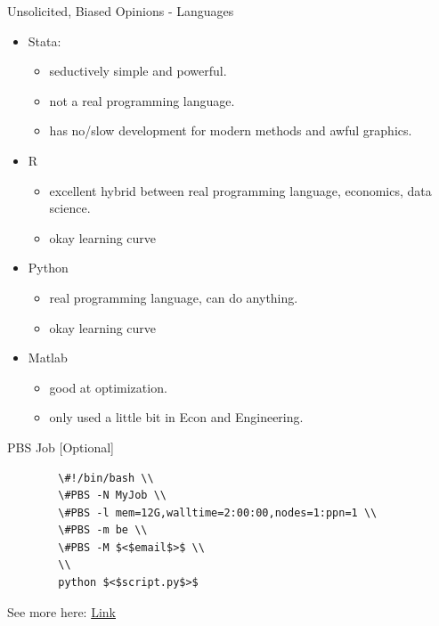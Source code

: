 \documentclass{beamer}
\begin{document}
\begin{frame}{Unsolicited, Biased Opinions - Languages}
    \begin{itemize}
        \item Stata: 
        \begin{itemize}
            \item seductively simple and powerful.
            \item not a real programming language.
            \item has no/slow development for modern methods and awful graphics.
        \end{itemize}
        \item R
        \begin{itemize}
            \item excellent hybrid between real programming language, economics, data science.
            \item okay learning curve
        \end{itemize}
        \item Python
        \begin{itemize}
            \item real programming language, can do anything.
            \item okay learning curve
        \end{itemize}
        \item Matlab
        \begin{itemize}
            \item good at optimization.
            \item only used a little bit in Econ and Engineering.
        \end{itemize}
    \end{itemize}
\end{frame}


\begin{frame}[label=BashFileSlide]{PBS Job [Optional]}
    \begin{verbatim}
        \#!/bin/bash \\
        \#PBS -N MyJob \\
        \#PBS -l mem=12G,walltime=2:00:00,nodes=1:ppn=1 \\
        \#PBS -m be \\
        \#PBS -M $<$email$>$ \\
        \\
        python $<$script.py$>$
    \end{verbatim}
    See more here: \href{https://econ-help.mit.edu/kb/advanced-batch-usage}{Link} \\
    \hyperlink{BashFileSlideBack}{}
\end{frame}
\end{document}
